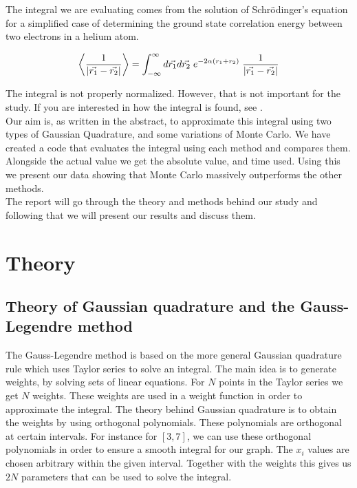 \documentclass{article}
\begin{document}
The integral we are evaluating comes from the solution of Schrödinger's equation for a simplified case of determining the ground state correlation energy between two electrons in a helium atom.

\begin{equation} \label{eq:integral}
    \left\langle \frac{1}{| \vec{r_1} - \vec{r_2} |} \right\rangle = \int_{-\infty} ^\infty d \vec{r_1} d \vec{r_2} \hspace{1mm} e^{- 2 \alpha (r_1 + r_2)} \hspace{1mm} \frac{1}{| \vec{r_1} - \vec{r_2} |}
\end{equation}

The integral is not properly normalized. However, that is not important for the study.
If you are interested in how the integral is found, see \cite{task}.\\
Our aim is, as written in the abstract, to approximate this integral using two types of Gaussian Quadrature, and some variations of Monte Carlo. We have created a code that evaluates the integral using each method and compares them. Alongside the actual value we get the absolute value, and time used. Using this we present our data showing that Monte Carlo massively outperforms the other methods.\\
The report will go through the theory and methods behind our study and following that we will present our results and discuss them.

\vspace{1cm}

\section{Theory} \label{sec:Theory}

\subsection{Theory of Gaussian quadrature and the Gauss-Legendre method}

The Gauss-Legendre method is based on the more general Gaussian quadrature rule which uses Taylor series to solve an integral. The main idea is to generate weights, by solving sets of linear equations. For $N$ points in the Taylor series we get $N$ weights. These weights are used in a weight function in order to approximate the integral. The theory behind Gaussian quadrature is to obtain the weights by using orthogonal polynomials. These polynomials are orthogonal at certain intervals. For instance for $[3,7]$, we can use these orthogonal polynomials in order to ensure a smooth integral for our graph. The $x_i$ values are chosen arbitrary within the given interval. Together with the weights this gives us $2N$ parameters that can be used to solve the integral. \\
\end{document}
